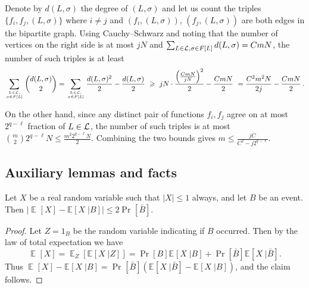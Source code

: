 \documentclass{toc}
\newcommand\card[1]{\left| {#1} \right|}
\newcommand\Prob[2]{{\Pr_{#1}\left[ {#2} \right]}}
\newcommand\cExpect[3]{{\mathbb{E}_{#1}\left[ \left. #3 \;\right\vert #2 \right]}}
\newcommand\Expect[2]{{\mathop{\mathbb{E}}_{#1}\left[ {#2} \right]}}
\renewcommand\geq{\geqslant}
\renewcommand\leq{\leqslant}
\begin{document}
Denote by $d(L,\sigma)$ the degree of $(L,\sigma)$
and let us count the %
%
%
%
triples  $\{f_i,f_j, (L,\sigma)\}$
where $i\neq j$ and $(f_i, (L,\sigma))$, $(f_j, (L,\sigma))$ are
both edges in the bipartite graph. Using %
Cauchy--Schwarz %
and noting that the number of vertices on the right side is at most $j N$ and
$\sum_{L \in {\cal L}, \sigma \in F[L]}{d(L,\sigma)} = CmN$,
the number of such triples is %
at least  %
$$ \sum\limits_{L\in {\cal L}, \atop{\sigma\in F[L]}}{{d(L,\sigma) \choose 2}} = \sum\limits_{L\in {\cal L}, \atop{\sigma\in F[L]}} \frac{d(L,\sigma)^2}{2} - \frac{d(L,\sigma)}{2}
 \ \geq \ j N \cdot \frac{\left(\frac{CmN}{jN}\right)^2}{2} - \frac{CmN}{2} \  = \frac{C^2 m^2 N}{2j} - \frac{CmN}{2}\,.$$%

On the other hand, since any distinct pair of functions $f_i,f_j$ agree on at most $2^{q-\ell}$ fraction of $L \in {\cal L}$,
the number of such triples is at most $
{m \choose 2} 2^{q-\ell} N \leq \frac{ m^2 2^{q-\ell} N}{2}.  $ Combining the two bounds gives $m \leq \frac{jC}{C^2 - j 2^{q-\ell}}$.


\subsection{Auxiliary lemmas and facts}

%
%
\begin{claim}\label{claim:gen_claim}
Let $X$ be a real random variable such that $\card{X}\leq 1$ always, and let $B$ be an event.
Then $\left|\Expect{}{X}-\cExpect{}{B}{X}\right|\leq 2\Prob{}{\bar{B}}$.
\end{claim}
\begin{proof}
Let $Z = 1_B$ be the random variable indicating if $B$ occurred. Then by the law of 
total expectation we have
\[
\Expect{}{X} = \Expect{Z}{\cExpect{}{Z}{X}} = \Prob{}{B} \cExpect{}{B}{X} + \Prob{}{\bar{B}}\cExpect{}{\bar{B}}{X}.
\]
Thus $\Expect{}{X}-\cExpect{}{B}{X} = \Prob{}{\bar{B}}(\cExpect{}{\bar{B}}{X}-\cExpect{}{B}{X})$,
and the claim follows.
\end{proof}
\end{document}
